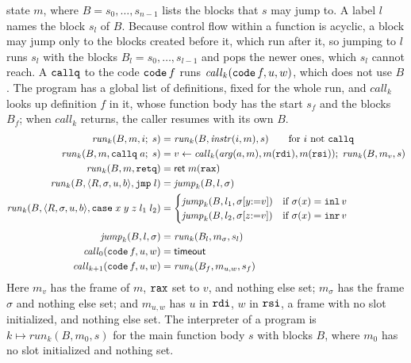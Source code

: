 state $m$, where $B = s_0, \ldots, s_{n-1}$ lists the blocks that $s$
may jump to. A label $l$ names the block $s_l$ of $B$. Because control
flow within a function is acyclic, a block may jump only to the blocks
created before it, which run after it, so jumping to $l$ runs $s_l$ with the blocks
$B_l = s_0, \ldots, s_{l-1}$ and pops the newer ones, which $s_l$
cannot reach. A $\mathtt{callq}$ to the code $\mathtt{code}\,f$ runs
$\mathit{call}_k(\mathtt{code}\,f, u, w)$, which does not use $B$. The
program has a global list of definitions, fixed for the whole run, and
$\mathit{call}_k$ looks up definition $f$ in it, whose function body has
the start $s_f$ and the blocks $B_f$; when $\mathit{call}_k$ returns,
the caller resumes with its own $B$.
\begin{align*}
  \mathit{run}_k(B, m, i;\; s) &= \mathit{run}_k(B, \mathit{instr}(i, m), s)
    \qquad\text{for $i$ not $\mathtt{callq}$} \\
  \mathit{run}_k(B, m, \mathtt{callq}\; a;\; s) &= v \leftarrow \mathit{call}_k(\mathit{arg}(a, m), m(\mathtt{rdi}), m(\mathtt{rsi}));\;
    \mathit{run}_k(B, m_v, s) \\
  \mathit{run}_k(B, m, \mathtt{retq}) &= \mathsf{ret}\; m(\mathtt{rax}) \\
  \mathit{run}_k(B, \langle R, \sigma, u, b\rangle, \mathtt{jmp}\;l) &= \mathit{jump}_k(B, l, \sigma) \\
  \mathit{run}_k(B, \langle R, \sigma, u, b\rangle, \mathtt{case}\;x\;y\;z\;l_1\;l_2) &= \begin{cases}
      \mathit{jump}_k(B, l_1, \sigma[y{:=}v]) & \text{if } \sigma(x) = \mathtt{inl}\,v\\
      \mathit{jump}_k(B, l_2, \sigma[z{:=}v]) & \text{if } \sigma(x) = \mathtt{inr}\,v
    \end{cases} \\[4pt]
  \mathit{jump}_k(B, l, \sigma) &= \mathit{run}_k(B_l, m_\sigma, s_l) \\
  \mathit{call}_0(\mathtt{code}\,f, u, w) &= \mathsf{timeout} \\
  \mathit{call}_{k+1}(\mathtt{code}\,f, u, w) &= \mathit{run}_k(B_f, m_{u,w}, s_f)
\end{align*}
Here $m_v$ has the frame of $m$, $\mathtt{rax}$ set to $v$, and nothing else set;
$m_\sigma$ has the frame
$\sigma$ and nothing else set; and $m_{u,w}$ has $u$ in $\mathtt{rdi}$, $w$ in
$\mathtt{rsi}$, a frame with no slot initialized, and nothing else set. The interpreter of a program
is $k \mapsto \mathit{run}_k(B, m_0, s)$ for the main function body $s$ with
blocks $B$, where $m_0$ has no slot initialized and nothing set.

